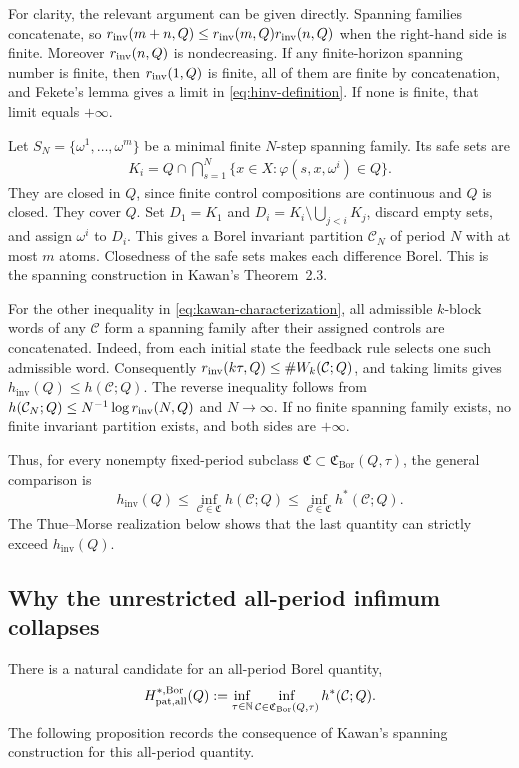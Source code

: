 \documentclass[11pt,reqno]{amsart}
\numberwithin{equation}{section}
\theoremstyle{definition}
\theoremstyle{definition}
\newcommand{\N}{\mathbb N}
\newcommand{\C}{\mathcal C}
\newcommand{\hpat}{h^{*}}
\newcommand{\hinv}{h_{\mathrm{inv}}}
\newcommand{\Bor}{\mathrm{Bor}}
\begin{document}
For clarity, the relevant argument can be given directly. Spanning
families concatenate, so
$r_{\rm inv}(m+n,Q)\le r_{\rm inv}(m,Q)r_{\rm inv}(n,Q)$ when the
right-hand side is finite. Moreover $r_{\rm inv}(n,Q)$ is nondecreasing.
If any finite-horizon spanning number is finite, then $r_{\rm inv}(1,Q)$
is finite, all of them are finite by concatenation, and Fekete's lemma
gives a limit in \eqref{eq:hinv-definition}. If none is finite, that
limit equals $+\infty$.

Let $S_N=\{\omega^1,\ldots,\omega^m\}$ be a minimal finite
$N$-step spanning family. Its safe sets are
\begin{align*}
 K_i=Q\cap\bigcap_{s=1}^{N}
       \{x\in X:\varphi(s,x,\omega^i)\in Q\}.
\end{align*}
They are closed in $Q$, since finite control compositions are continuous
and $Q$ is closed. They cover $Q$. Set
$D_1=K_1$ and $D_i=K_i\setminus\bigcup_{j<i}K_j$, discard empty sets,
and assign $\omega^i$ to $D_i$. This gives a Borel invariant partition
$\C_N$ of period $N$ with at most $m$ atoms. Closedness of the safe sets makes each difference Borel. This is the
spanning construction in Kawan's Theorem~2.3.

For the other inequality in \eqref{eq:kawan-characterization}, all
admissible $k$-block words of any $\C$ form a spanning family after their
assigned controls are concatenated. Indeed, from each initial state the
feedback rule selects one such admissible word. Consequently
$r_{\rm inv}(k\tau,Q)\le\#W_k(\C;Q)$, and taking limits gives
$\hinv(Q)\le h(\C;Q)$. The reverse inequality follows from
$h(\C_N;Q)\le N^{-1}\log r_{\rm inv}(N,Q)$ and $N\to\infty$.
If no finite spanning family exists, no finite invariant partition exists,
and both sides are $+\infty$.

Thus, for every nonempty fixed-period subclass
$\mathfrak C\subset\mathfrak C_{\Bor}(Q,\tau)$, the general comparison is
\begin{equation}\label{eq:three-quantities}
 \hinv(Q)
 \le\inf_{\C\in\mathfrak C}h(\C;Q)
 \le\inf_{\C\in\mathfrak C}\hpat(\C;Q).
\end{equation}
The Thue--Morse realization below shows that the last quantity can
strictly exceed $\hinv(Q)$.

\subsection{Why the unrestricted all-period infimum collapses}
There is a natural candidate for an all-period Borel quantity,
\begin{align*}
 H_{\rm pat,all}^{*,\Bor}(Q)
 :=\inf_{\tau\in\N}\inf_{\C\in\mathfrak C_{\Bor}(Q,\tau)}
       \hpat(\C;Q).
\end{align*}
The following proposition records the consequence of Kawan's spanning
construction for this all-period quantity.
\end{document}
